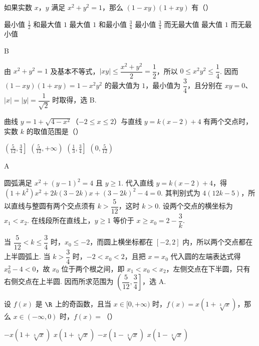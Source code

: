 \documentclass[UTF8,a4paper,oneside,11pt]{ctexbook}
\begin{document}
\begin{problem}
如果实数 \(x\)，\(y\) 满足 \(x^2 + y^2 = 1\)，那么 \((1 - xy)(1 + xy)\) 有（\quad）

\choices
    {最小值 \(\frac{1}{2}\) 和最大值 \(1\)}
    {最大值 \(1\) 和最小值 \(\frac{3}{4}\)}
    {最小值 \(\frac{3}{4}\) 而无最大值}
    {最大值 \(1\) 而无最小值}
\end{problem}

\begin{answer}
B
\end{answer}

\begin{solution}
由 \(x^2+y^2=1\) 及基本不等式，\(|xy|\leqslant\dfrac{x^2+y^2}{2}=\dfrac12\)，所以 \(0\leqslant x^2y^2\leqslant\dfrac14\). 因而
\((1-xy)(1+xy)=1-x^2y^2\) 的最大值为 \(1\)，最小值为 \(\dfrac34\)，且分别在 \(xy=0\)、\(|x|=|y|=\dfrac1{\sqrt2}\) 时取得，选 B.
\end{solution}

\begin{problem}
曲线 \(y = 1 + \sqrt{4 - x^2}\)（\(-2 \leqslant x \leqslant 2\)）与直线 \(y = k(x - 2) + 4\) 有两个交点时，实数 \(k\) 的取值范围是（\quad）

\choices
    {\(\left(\frac{5}{12}, \frac{3}{4}\right]\)}
    {\(\left(\frac{5}{12}, +\infty\right)\)}
    {\(\left(\frac{1}{3}, \frac{3}{4}\right]\)}
    {\(\left(0, \frac{5}{12}\right)\)}
\end{problem}

\begin{answer}
A
\end{answer}

\begin{solution}
圆弧满足 \(x^2+(y-1)^2=4\) 且 \(y\geqslant1\). 代入直线 \(y=k(x-2)+4\)，得
\( (1+k^2)x^2+2k(3-2k)x+(3-2k)^2-4=0\). 其判别式为 \(4(12k-5)\)，所以直线与整圆有两个交点须有 \(k>\dfrac5{12}\)，这时 \(k>0\). 设两个交点的横坐标为 \(x_1<x_2\). 在线段所在直线上，\(y\geqslant1\) 等价于 \(x\geqslant x_0=2-\dfrac3k\).

当 \(\dfrac5{12}<k\leqslant\dfrac34\) 时，\(x_0\leqslant-2\)，而圆上横坐标都在 \([-2,2]\) 内，所以两个交点都在上半圆弧上. 当 \(k>\dfrac34\) 时，\(-2<x_0<2\)，且把 \(x=x_0\) 代入圆的左端表达式得 \(x_0^2-4<0\)，故 \(x_0\) 位于两个根之间，即 \(x_1<x_0<x_2\)，左侧交点在下半圆，只有右侧交点在上半圆. 因而所求范围为 \(\left(\dfrac5{12},\dfrac34\right]\)，选 A.
\end{solution}

\begin{problem}
设 \(f(x)\) 是 \(\R\) 上的奇函数，且当 \(x \in [0,+\infty)\) 时，\(f(x) = x\left(1 + \sqrt[3]{x}\right)\)，那么 \(x \in (-\infty,0)\) 时，\(f(x)=\)（\quad）

\choices
    {\(-x\left(1 + \sqrt[3]{x}\right)\)}
    {\(x\left(1 + \sqrt[3]{x}\right)\)}
    {\(-x\left(1 - \sqrt[3]{x}\right)\)}
    {\(x\left(1 - \sqrt[3]{x}\right)\)}
\end{problem}
\end{document}
